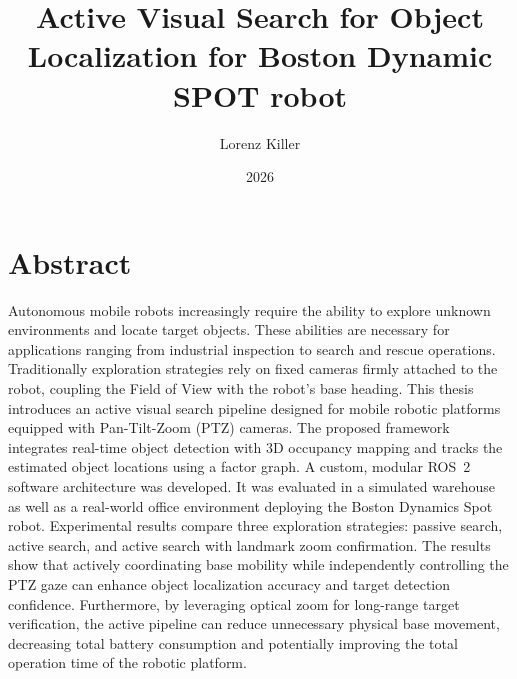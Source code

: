 \documentclass[
	parspace, %
	noindent, %
	final, %
]{elteikthesis}
\title{Active Visual Search for Object Localization for Boston Dynamic SPOT robot} %
\date{2026} %
\author{Lorenz Killer}
\affiliation{Associate Professor, ELTE} %
\begin{document}


\maketitle
% 

\chapter*{Abstract}

Autonomous mobile robots increasingly require the ability to explore unknown environments and locate target objects. These abilities are necessary for applications ranging from industrial inspection to search and rescue operations. Traditionally exploration strategies rely on fixed cameras firmly attached to the robot, coupling the Field of View with the robot's base heading.
This thesis introduces an active visual search pipeline designed for mobile robotic platforms equipped with Pan-Tilt-Zoom (PTZ) cameras. The proposed framework integrates real-time object detection with 3D occupancy mapping and tracks the estimated object locations using a factor graph. A custom, modular ROS~2 software architecture was developed. It was evaluated in a simulated warehouse as well as a real-world office environment deploying the Boston Dynamics Spot robot. 
Experimental results compare three exploration strategies: passive search, active search, and active search with landmark zoom confirmation. The results show that actively coordinating base mobility while independently controlling the PTZ gaze can enhance object localization accuracy and target detection confidence. Furthermore, by leveraging optical zoom for long-range target verification, the active pipeline can reduce unnecessary physical base movement, decreasing total battery consumption and potentially improving the total operation time of the robotic platform.
\cleardoublepage

\tableofcontents
\cleardoublepage

\bigskip
\end{document}
